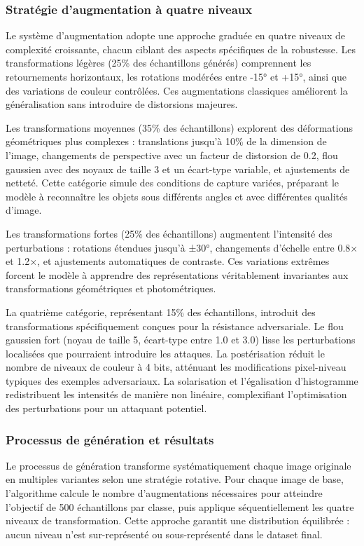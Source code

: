 \subsubsection{Stratégie d'augmentation à quatre niveaux}

Le système d'augmentation adopte une approche graduée en quatre niveaux de complexité croissante, chacun ciblant des aspects spécifiques de la robustesse. Les transformations légères (25\% des échantillons générés) comprennent les retournements horizontaux, les rotations modérées entre -15° et +15°, ainsi que des variations de couleur contrôlées. Ces augmentations classiques améliorent la généralisation sans introduire de distorsions majeures.

Les transformations moyennes (35\% des échantillons) explorent des déformations géométriques plus complexes : translations jusqu'à 10\% de la dimension de l'image, changements de perspective avec un facteur de distorsion de 0.2, flou gaussien avec des noyaux de taille 3 et un écart-type variable, et ajustements de netteté. Cette catégorie simule des conditions de capture variées, préparant le modèle à reconnaître les objets sous différents angles et avec différentes qualités d'image.

Les transformations fortes (25\% des échantillons) augmentent l'intensité des perturbations : rotations étendues jusqu'à ±30°, changements d'échelle entre 0.8× et 1.2×, et ajustements automatiques de contraste. Ces variations extrêmes forcent le modèle à apprendre des représentations véritablement invariantes aux transformations géométriques et photométriques.

La quatrième catégorie, représentant 15\% des échantillons, introduit des transformations spécifiquement conçues pour la résistance adversariale. Le flou gaussien fort (noyau de taille 5, écart-type entre 1.0 et 3.0) lisse les perturbations localisées que pourraient introduire les attaques. La postérisation réduit le nombre de niveaux de couleur à 4 bits, atténuant les modifications pixel-niveau typiques des exemples adversariaux. La solarisation et l'égalisation d'histogramme redistribuent les intensités de manière non linéaire, complexifiant l'optimisation des perturbations pour un attaquant potentiel.

\subsubsection{Processus de génération et résultats}

Le processus de génération transforme systématiquement chaque image originale en multiples variantes selon une stratégie rotative. Pour chaque image de base, l'algorithme calcule le nombre d'augmentations nécessaires pour atteindre l'objectif de 500 échantillons par classe, puis applique séquentiellement les quatre niveaux de transformation. Cette approche garantit une distribution équilibrée : aucun niveau n'est sur-représenté ou sous-représenté dans le dataset final.


